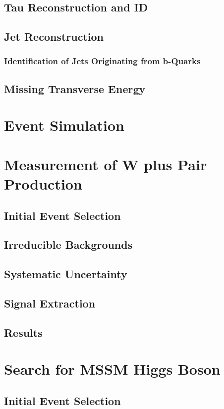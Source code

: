 \documentclass[oneside, letterpaper, 12pt, oldfontcommands]{memoir}
\begin{document}
\section{Tau Reconstruction and ID}
\section{Jet Reconstruction}
\subsection{Identification of Jets Originating from b-Quarks}
\section{Missing Transverse Energy}

\chapter{Event Simulation}

\chapter{Measurement of W plus \bbbar Pair Production}
\section{Initial Event Selection}
\section{Irreducible Backgrounds}
\section{Systematic Uncertainty}
\section{Signal Extraction}
\section{Results}

\chapter{Search for MSSM Higgs Boson}
\section{Initial Event Selection}
\end{document}
